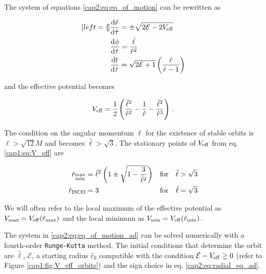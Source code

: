 The system of equations \ref{cap2:eq:eq_of_motion} can be rewritten as

\begin{subequations}
    \begin{align}[left = {\empheqlbrace}]
        &\dv{\hat r}{\hat \tau} = \pm \sqrt{2 \mathcal E - 2 V_{\rm eff}}
        \label{cap2:eq:radial_eq_ad} \\
        &\dv{\phi}{\hat \tau} = \frac{\hat \ell}{\hat r^2}
        \label{cap2:eq:angular_eq_ad} \\
        &\dv{t}{\hat \tau} = \sqrt{2 \mathcal E + 1}
        \left(\frac{\hat r}{\hat r - 1}\right) \label{cap2:eq:time_eq_ad}
    \end{align}
    \label{cap2:eq:eq_of_motion_ad}
\end{subequations}

and the effective potential becomes

\begin{equation}
    V_{\rm eff} = \frac{1}{2} \left(\frac{\hat \ell^2}{\hat r^2}
    - \frac{1}{\hat r} - \frac{\hat \ell^2}{\hat r^3} \right) \, .
\end{equation}

The condition on the angular momentum $\ell$ for the existence of stable orbits
is $\ell > \sqrt{12} M$ and becomes $\hat \ell > \sqrt{3}$.
The stationary points of $V_{\rm eff}$ from eq. \ref{cap1:eq:V_eff} are

\begin{subequations}
    \begin{align}
        \hat r_{\substack{\rm max \\ \rm min}} &= \hat \ell^2
        \left(1 \pm \sqrt{1 - \frac{3}{\hat \ell^2}} \right)
        &&{\rm for} \quad \hat \ell > \sqrt{3} \\
        \hat r_{\rm ISCO} &= 3
        &&{\rm for} \quad \hat \ell = \sqrt{3}
    \end{align}
\end{subequations}

We will often refer to the local maximum of the effective potential as
$V_{\rm max} = V_{\rm eff}(\hat r_{\rm max})$ and the local minimum as
$V_{\rm min} = V_{\rm eff}(\hat r_{\rm min})$.

The system in \ref{cap2:eq:eq_of_motion_ad} can be solved numerically with
a fourth-order \texttt{Runge-Kutta} method.
The initial conditions that determine the orbit are $\hat \ell$,
$\mathcal E$, a starting radius $\hat r_0$ compatible with the condition
$\mathcal E - V_{\rm eff} \geq 0$ (refer to Figure
\ref{cap1:fig:V_eff_orbits}) and the sign choice in eq. \ref{cap2:eq:radial_eq_ad}.


